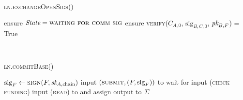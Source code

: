 \begin{center}
\begin{processbox}{\textsc{ln.exchangeOpenSigs}()}
\begin{algorithmic}[1]
        \State {}
      \Else \: 
        \State {}
        \State {}
        \label{code:ln:exchange-open-sigs:state-open}
      \EndIf
      \State {}
      \label{code:ln:exchange-open-sigs:b-send}
      \State ensure $\itistate = \textsc{waiting for comm sig}$
      \State ensure \textsc{verify}($C_{A, 0}$, $\mathrm{sig}_{B, C, 0}$,
      $\textit{pk}_{B, F}$) = True
      \label{code:ln:exchange-open-sigs:a-verify}
    \end{algorithmic}
  \end{processbox}
  \label{code:ln:exchange-open-sigs}
\end{center} \ \\

\begin{center}
  \begin{processbox}{\textsc{ln.commitBase}()}
    \ \\
    \begin{algorithmic}[1]
      \State $\mathrm{sig}_F \gets \textsc{sign}(F, \textit{sk}_{A, \mathrm{chain}})$
      \label{code:ln:base:sign-funding}
      \State input $(\textsc{submit}, (F, \mathrm{sig}_F))$ to \ledger{}
      \label{code:ln:commit-base:f-in-state}
        \State wait for input (\textsc{check funding}) 
        \State input (\textsc{read}) to \ledger and assign output to $\Sigma$
      \EndWhile
    \end{algorithmic}
  \end{processbox}
  \label{code:ln:commit-base}
\end{center} \ \\

